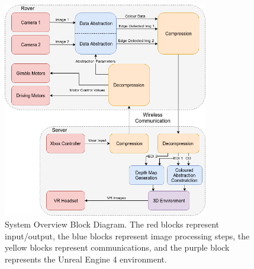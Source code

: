 \begin{figure}[H]
    \begin{center}
      \includegraphics[width=0.8\textwidth]{Figures/System.png}
      \caption[System Overview Block Diagram]{System Overview Block Diagram. The red blocks represent input/output, the blue blocks represent image processing steps, the yellow blocks represent communications, and the purple block represents the Unreal Engine 4 environment.}
      \label{fig:system}
    \end{center}
\end{figure}